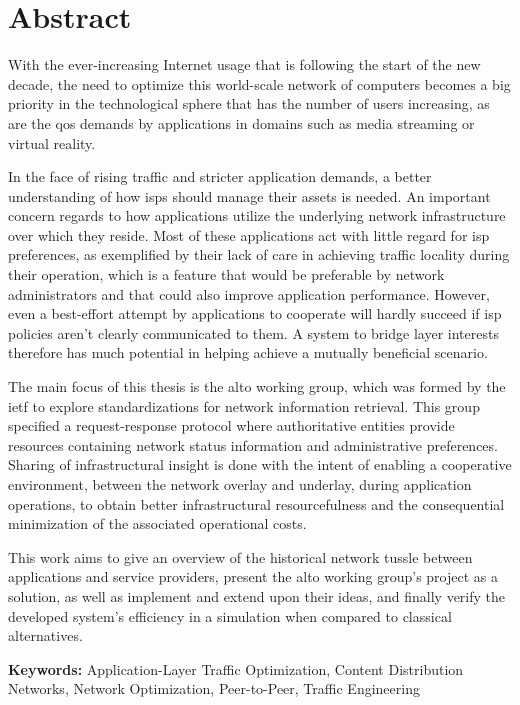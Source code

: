 \chapter{Abstract}

    With the ever-increasing Internet usage that is following the start of the new decade, the need to optimize this world-scale network of computers becomes a big priority in the technological sphere that has the number of users increasing, as are the \gls{qos} demands by applications in domains such as media streaming or virtual reality.

    In the face of rising traffic and stricter application demands, a better understanding of how \glspl{isp} should manage their assets is needed.
    An important concern regards to how applications utilize the underlying network infrastructure over which they reside.
    Most of these applications act with little regard for \gls{isp} preferences, as exemplified by their lack of care in achieving traffic locality during their operation, which is a feature that would be preferable by network administrators and that could also improve application performance.
    However, even a best-effort attempt by applications to cooperate will hardly succeed if \gls{isp} policies aren't clearly communicated to them.
    A system to bridge layer interests therefore has much potential in helping achieve a mutually beneficial scenario.

    The main focus of this thesis is the \gls{alto} working group, which was formed by the \gls{ietf} to explore standardizations for network information retrieval. 
    This group specified a request-response protocol where authoritative entities provide resources containing network status information and administrative preferences.
    Sharing of infrastructural insight is done with the intent of enabling a cooperative environment, between the network overlay and underlay, during application operations, to obtain better infrastructural resourcefulness and the consequential minimization of the associated operational costs.

    This work aims to give an overview of the historical network tussle between applications and service providers, present the \gls{alto} working group's project as a solution, as well as implement and extend upon their ideas, and finally verify the developed system's efficiency in a simulation when compared to classical alternatives.

    \bigskip

    \textbf{Keywords:} Application-Layer Traffic Optimization, Content Distribution Networks, Network Optimization, Peer-to-Peer, Traffic Engineering

